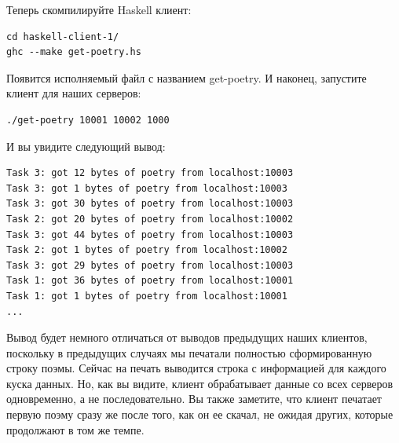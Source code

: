 Теперь скомпилируйте Haskell клиент:

\begin{scriptsize}\begin{verbatim}
cd haskell-client-1/
ghc --make get-poetry.hs
\end{verbatim}\end{scriptsize}

Появится исполняемый файл с названием get-poetry. И наконец, 
запустите клиент для наших серверов: 

\begin{scriptsize}\begin{verbatim}
./get-poetry 10001 10002 1000
\end{verbatim}\end{scriptsize}

И вы увидите следующий вывод:

\begin{scriptsize}\begin{verbatim}
Task 3: got 12 bytes of poetry from localhost:10003
Task 3: got 1 bytes of poetry from localhost:10003
Task 3: got 30 bytes of poetry from localhost:10003
Task 2: got 20 bytes of poetry from localhost:10002
Task 3: got 44 bytes of poetry from localhost:10003
Task 2: got 1 bytes of poetry from localhost:10002
Task 3: got 29 bytes of poetry from localhost:10003
Task 1: got 36 bytes of poetry from localhost:10001
Task 1: got 1 bytes of poetry from localhost:10001
...
\end{verbatim}\end{scriptsize}


Вывод будет немного отличаться от выводов предыдущих наших клиентов, 
поскольку в предыдущих случаях мы печатали полностью сформированную  
строку поэмы. Сейчас на печать выводится строка с информацией для 
каждого куска данных. Но, как вы видите, клиент обрабатывает 
данные со всех серверов одновременно, а не последовательно. Вы также  
заметите, что клиент печатает первую поэму сразу же после того, как 
он ее скачал, не ожидая других, которые продолжают в том же темпе. 


